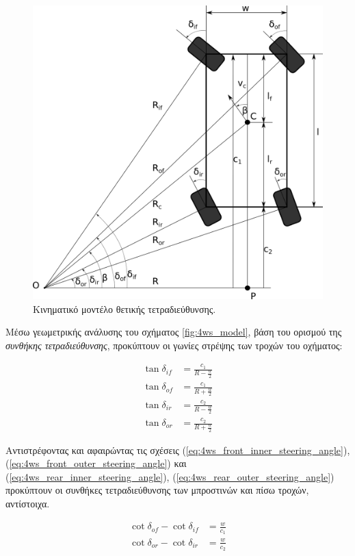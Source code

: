 \begin{figure}[!ht]
	\centering
	\includegraphics[width=0.7\linewidth]{Chapters/Chapter2/Figures/pos_4ws_model.png}
	\caption{Κινηματικό μοντέλο θετικής τετραδιεύθυνσης.}
	\label{fig:pos_4ws_model}
\end{figure}

\bigskip
Μέσω γεωμετρικής ανάλυσης του σχήματος \ref{fig:4ws_model}, βάση του ορισμού της \textit{συνθήκης τετραδιεύθυνσης}, προκύπτουν οι γωνίες στρέψης των τροχών του οχήματος:

\begin{align}
	\tan{\delta_{if}} &= \frac{c_1}{R-\frac{w}{2}}
	\label{eq:4ws_front_inner_steering_angle}\\
	\tan{\delta_{of}} &= \frac{c_1}{R+\frac{w}{2}}
	\label{eq:4ws_front_outer_steering_angle}\\
	\tan{\delta_{ir}} &= \frac{c_2}{R-\frac{w}{2}}
	\label{eq:4ws_rear_inner_steering_angle}\\
	\tan{\delta_{or}} &= \frac{c_2}{R+\frac{w}{2}}
	\label{eq:4ws_rear_outer_steering_angle}		
\end{align}

Aντιστρέφοντας και αφαιρώντας τις σχέσεις (\ref{eq:4ws_front_inner_steering_angle}), (\ref{eq:4ws_front_outer_steering_angle}) και (\ref{eq:4ws_rear_inner_steering_angle}), (\ref{eq:4ws_rear_outer_steering_angle}) προκύπτουν οι συνθήκες τετραδιεύθυνσης των μπροστινών και πίσω τροχών, αντίστοιχα.

\begin{align}
	\cot{\delta_{of}} - \cot{\delta_{if}} &= \frac{w}{c_1}
	\label{eq:front_4ws_condition}\\
	\cot{\delta_{or}} - \cot{\delta_{ir}} &= \frac{w}{c_2}
	\label{eq:rear_4ws_condition}
\end{align}

